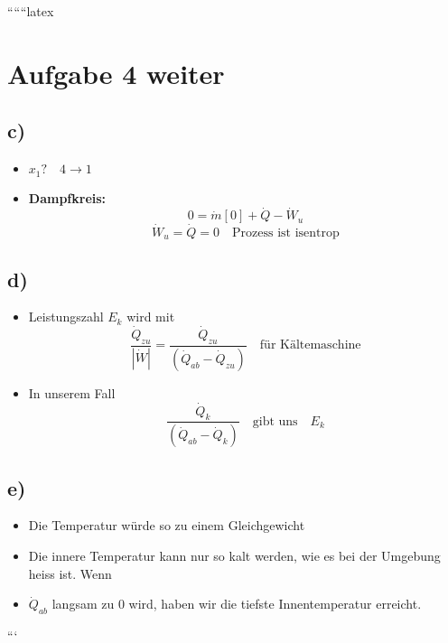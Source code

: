 ``````latex


\section*{Aufgabe 4 weiter}

\subsection*{c)}
\begin{itemize}
    \item $x_1? \quad 4 \rightarrow 1$
    \item \textbf{Dampfkreis:} 
    \[
    0 = \dot{m} [0] + \dot{Q} - \dot{W}_u
    \]
    \[
    \dot{W}_u = \dot{Q} = 0 \quad \text{Prozess ist isentrop}
    \]
\end{itemize}

\subsection*{d)}
\begin{itemize}
    \item Leistungszahl $E_k$ wird mit 
    \[
    \frac{\dot{Q}_{zu}}{|\dot{W}|} = \frac{\dot{Q}_{zu}}{(\dot{Q}_{ab} - \dot{Q}_{zu})} \quad \text{für Kältemaschine}
    \]
    \item In unserem Fall 
    \[
    \frac{\dot{Q}_k}{(\dot{Q}_{ab} - \dot{Q}_k)} \quad \text{gibt uns} \quad E_k
    \]
\end{itemize}

\subsection*{e)}
\begin{itemize}
    \item Die Temperatur würde so zu einem Gleichgewicht
    \item Die innere Temperatur kann nur so kalt werden, wie es bei der Umgebung heiss ist. Wenn 
    \item $\dot{Q}_{ab}$ langsam zu 0 wird, haben wir die tiefste Innentemperatur erreicht.
\end{itemize}

```
